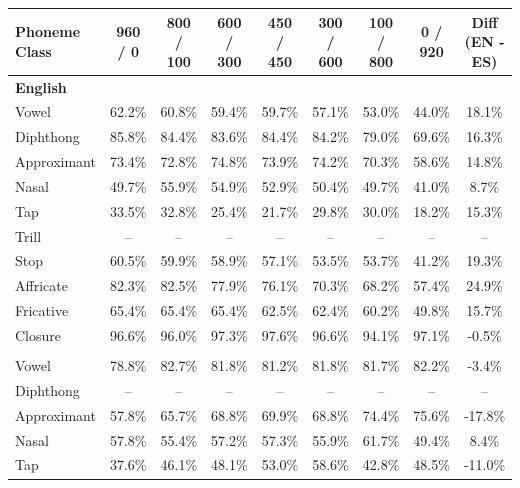 \newpage
\begin{table}
\centering
\scriptsize
\begin{tabular}{l|ccccccc|c}
\toprule
Phoneme Class & 960 / 0 & 800 / 100 & 600 / 300 & 450 / 450 & 300 / 600 & 100 / 800 & 0 / 920 & Diff (EN - ES) \\
\midrule
\multicolumn{9}{l}{\textbf{English}} \\
Vowel & 62.2\% & 60.8\% & 59.4\% & 59.7\% & 57.1\% & 53.0\% & 44.0\% & 18.1\% \\
Diphthong & 85.8\% & 84.4\% & 83.6\% & 84.4\% & 84.2\% & 79.0\% & 69.6\% & 16.3\% \\
Approximant & 73.4\% & 72.8\% & 74.8\% & 73.9\% & 74.2\% & 70.3\% & 58.6\% & 14.8\% \\
Nasal & 49.7\% & 55.9\% & 54.9\% & 52.9\% & 50.4\% & 49.7\% & 41.0\% & 8.7\% \\
Tap & 33.5\% & 32.8\% & 25.4\% & 21.7\% & 29.8\% & 30.0\% & 18.2\% & 15.3\% \\
Trill & -- & -- & -- & -- & -- & -- & -- & -- \\
Stop & 60.5\% & 59.9\% & 58.9\% & 57.1\% & 53.5\% & 53.7\% & 41.2\% & 19.3\% \\
Affricate & 82.3\% & 82.5\% & 77.9\% & 76.1\% & 70.3\% & 68.2\% & 57.4\% & 24.9\% \\
Fricative & 65.4\% & 65.4\% & 65.4\% & 62.5\% & 62.4\% & 60.2\% & 49.8\% & 15.7\% \\
Closure & 96.6\% & 96.0\% & 97.3\% & 97.6\% & 96.6\% & 94.1\% & 97.1\% & -0.5\% \\
\addlinespace
\multicolumn{9}{l}{\textbf{Spanish}} \\
Vowel & 78.8\% & 82.7\% & 81.8\% & 81.2\% & 81.8\% & 81.7\% & 82.2\% & -3.4\% \\
Diphthong & -- & -- & -- & -- & -- & -- & -- & -- \\
Approximant & 57.8\% & 65.7\% & 68.8\% & 69.9\% & 68.8\% & 74.4\% & 75.6\% & -17.8\% \\
Nasal & 57.8\% & 55.4\% & 57.2\% & 57.3\% & 55.9\% & 61.7\% & 49.4\% & 8.4\% \\
Tap & 37.6\% & 46.1\% & 48.1\% & 53.0\% & 58.6\% & 42.8\% & 48.5\% & -11.0\% \\

\end{tabular}
\end{table}
